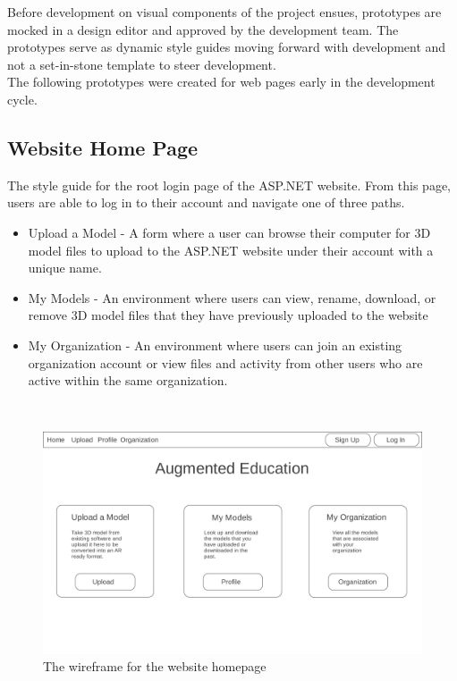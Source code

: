\hspace{7mm}
Before development on visual components of the project ensues, prototypes are mocked in a
design editor and approved by the development team.  The prototypes serve
as dynamic style guides moving forward with development and not a set-in-stone template
to steer development.\\

The following prototypes were created for web pages early in the development cycle.

\subsection{Website Home Page}
    \hspace{7mm} The style guide for the root login page of the ASP.NET website.
    From this page, users are able to log in to their account and navigate 
    one of three paths.
        \begin{itemize} 
            \item Upload a Model -
                A form where a user can browse their computer for 3D model files to
                upload to the ASP.NET website under their account with a unique name. 
            \item My Models - 
                An environment where users can view, rename, download, or remove
                3D model files that they have previously uploaded to the website
            \item My Organization -
                An environment where users can join an existing organization account
                or view files and activity from other users who are active within 
                the same organization.
        \end{itemize}
    \ \\
    \label{fig:proto_web_home}
    \begin{figure}[H]
        \centering \includegraphics[width=0.6\linewidth]{Home}
        \caption{The wireframe for the website homepage}
    \end{figure}

